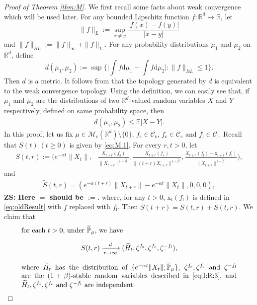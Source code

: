 \documentclass[12pt,a4paper]{amsart}
\theoremstyle{plain}
\theoremstyle{definition}
\numberwithin{equation}{section}
\begin{document}
\begin{proof}[Proof of Theorem \ref{thm:M}]
 	We first recall some facts about weak convergence which will be used later.
	For any bounded Lipschitz function $f:\mathbb R^d\mapsto \mathbb R$, let
\[
	\|f\|_L
	:=\sup_{x\neq y}\frac{|f(x)-f(y)|}{|x-y|}
\]
	and $\|f\|_{BL}:= \|f\|_{\infty}+\|f\|_L.$
	For any probability distributions $\mu_1$ and $\mu_2$ on $\mathbb R^d$, define
\[
	d(\mu_1,\mu_2)
  	:=\sup\Big\{\Big|\int f \mathrm d\mu_1-\int f \mathrm d\mu_2\Big|:\|f\|_{BL}\leq 1\Big\}.
\]
	Then $d$ is a metric. It follows from \cite[Theorem 11.3.3]{Dudley2002} that the topology generated by $d$ is equivalent to the weak convergence topology.
	Using the definition, we can easily see that, if $\mu_1$ and $\mu_2$ are the distributions of two $\mathbb R^d $-valued random variables $X$ and $Y$ respectively, defined on same probability space, then
\begin{align}
\label{ineq: distribution control}
  	d(\mu_1,\mu_2)
  	\leq \mathbb E|X-Y|.
\end{align}
	In this proof, let us fix $\mu\in \mathcal M_\mathrm c(\mathbb R^d)\setminus \{0\}$, $f_\mathrm s\in \mathcal C_\mathrm s$, $f_\mathrm c \in \mathcal C_\mathrm c$ and $f_\mathrm l \in \mathcal C_\mathrm l$.
	Recall that $S(t)~(t\geq 0)$ is given by \eqref{eq:M.1}.
	For every $r,t> 0$, let
\begin{align}
	S(t,r)
	:=\Big(e^{-\alpha t}\|X_t\|,& \frac{X_{t+r}(f_\mathrm s)}{\|X_{t+r}\|^{1-\tilde{\beta}}}, \frac{X_{t+r}(f_\mathrm c)}{\|(t+r)X_{t+r}\|^{1-\tilde{\beta}}}, \frac{X_{t+r}(f_\mathrm l)-\mathrm x_{t+r}(f_\mathrm l) }{\|X_{t+r}\|^{1-\tilde{\beta}}}\Big),
\end{align}
	and
\begin{align}
	\widetilde{S}(t,r)
	= (e^{-\alpha (t+r)}\|X_{t+r}\|-e^{-\alpha t}\|X_t\|,0,0,0),
\end{align}
{\bf ZS: Here $=$ should be $:=$.}
	where, for any $t>0$, $\mathrm x_t(f_\mathrm l)$ is defined in \eqref{eq:oldResult} with $f$ replaced with $f_\mathrm l$.
	Then $S(t+r)=S(t,r)+\widetilde{S}(t,r)$.
	We claim that
\begin{equation}
\label{eq:M.3}
\begin{minipage}{0.9\textwidth}
	for each $t> 0$, under $\widetilde{\mathbb P}_{\mu}$, we have
\[
	S(t,r)
	\xrightarrow[r\rightarrow \infty]{d} (\widetilde H_t,\zeta^{f_\mathrm s},\zeta^{f_\mathrm c},\zeta^{-f_\mathrm l}),
\]
	where $\widetilde H_t$ has the distribution of $\{e^{-\alpha t} \|X_t\|; \widetilde {\mathbb P}_\mu\}$, $\zeta^{f_\mathrm s},\zeta^{f_\mathrm c}$ and $\zeta^{-f_\mathrm l}$ are the $(1+\beta)$-stable random variables described in \eqref{eq:I:R:3}, 	and $\widetilde H_t,\zeta^{f_\mathrm s},\zeta^{f_\mathrm c}$ and $\zeta^{-f_\mathrm l}$ are independent.
\end{minipage}
\end{equation}


\end{proof}
\end{document}
